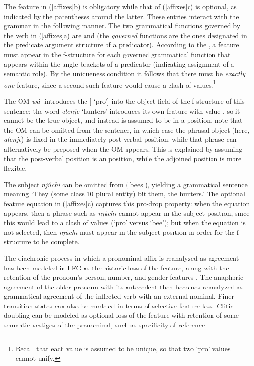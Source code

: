 \noindent
The  feature in (\ref{affixes}b) is obligatory while that of (\ref{affixes}c) is optional, as indicated by the parentheses around the latter.  These entries interact with the grammar in the following manner.  The two grammatical functions governed by the verb in (\ref{affixes}a) are  and  (the \textit{governed} functions are the ones designated in the predicate argument structure of a predicator).  According to the , a  feature must appear in the f-structure for each governed grammatical function that appears within the angle brackets of a predicator (indicating assignment of a semantic role).  By the uniqueness condition it follows that there must be \textit{exactly one}  feature, since a second such feature would cause a clash of values.\footnote{Recall that each  value is assumed to be unique, so that two `{pro}' values cannot unify.}  

The OM \textit{w\'{a}-} introduces the [ `{pro}'] into the object field of the f-structure of this sentence; the word \textit{alenje} `hunters' introduces its own  feature with value , so it cannot be the true object, and instead is assumed to be in a  position.  \citet[744--745]{bresnan+mchombo:1987} note that the OM can be omitted from the sentence, in which case the phrasal object (here, \textit{alenje}) is fixed in the immediately post-verbal position, while that phrase can alternatively be preposed when the OM appears.  This is explained by assuming that the post-verbal position is an  position, while the adjoined  position is more flexible.  

The subject \textit{nj\^{u}chi} can be omitted from (\ref{bees}), yielding a grammatical sentence meaning `They (some class 10 plural entity) bit them, the hunters.'  The optional  feature equation in (\ref{affixes}c) captures this pro-drop property: when the equation appears, then a phrase such as \textit{nj\^{u}chi} cannot appear in the subject position, since this would lead to a clash of  values 
(`{pro}' versus `{bee}'); but when the equation is not selected, then  \textit{nj\^{u}chi} must appear in the subject position in order for the f-structure to be complete.  

\largerpage[2]
The diachronic process in which a pronominal affix is reanalyzed as agreement has been modeled in LFG as the historic loss of the  feature, along with the retention of the pronoun's person, number, and gender features \citep{coppock+wechsler:2010}.  The anaphoric agreement of the older pronoun with its antecedent then becomes reanalyzed as grammatical agreement of the inflected verb with an external nominal.  Finer transition states can also be modeled in terms of selective feature loss.  Clitic doubling can be modeled as optional loss of the  feature with retention of some semantic vestiges of the pronominal, such as specificity of reference.

